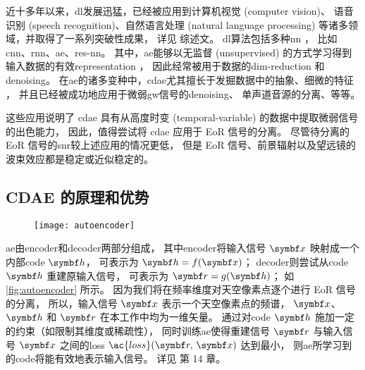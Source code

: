 近十多年以来，\ac{dl}发展迅猛，已经被应用到计算机视觉 (computer vision)、
语音识别 (speech recognition)、自然语言处理 (natural language processing)
等诸多领域，并取得了一系列突破性成果，
详见  综述文。
\ac{dl}算法包括多种\ac{nn} \cite{bengio2009,leCun2015,schmidhuber2015}，
比如\ac{cnn}、\ac{rnn}、\ac{ae}、\ac{res-nn}。
其中，\ac{ae}能够以无监督 (unsupervised) 的方式学习得到
输入数据的有效\ac{representation} \cite{bourlard1988}，
因此经常被用于数据的\ac{dim-reduction}\cite{hinton2006,wang2014}
和\ac{denoising}\cite{xie2012,lu2013,bengio2013}。
在\ac{ae}的诸多变种中，\ac{cdae}尤其擅长于发掘数据中的抽象、细微的特征 \cite{du2017}，
并且已经被成功地应用于微弱\ac{gw}信号的\ac{denoising}\cite{shen2017}、
单声道音源的分离\cite{grais2017}、等等。

这些应用说明了 \ac{cdae} 具有从高度时变 (temporal-variable)
的数据中提取微弱信号的出色能力，
因此，值得尝试将 \ac{cdae} 应用于 EoR 信号的分离。
尽管待分离的 EoR 信号的\ac{snr}较上述应用的情况更低，
但是 EoR 信号、前景辐射以及望远镜的波束效应都是稳定或近似稳定的。

\subsection{CDAE 的原理和优势}
\label{sec:cdae}

\begin{figure}[htp]
  \centering
  \texttt{[image: autoencoder]}
  \label{fig:autoencoder}
\end{figure}

\ac{ae}由\ac{encoder}和\ac{decoder}两部分组成，
其中\ac{encoder}将输入信号 $\B{x}$ 映射成一个内部\ac{code} $\B{h}$，
可表示为 $\B{h} = f(\B{x})$；
\ac{decoder}则尝试从\ac{code} $\B{h}$ 重建原输入信号，
可表示为 $\B{r} = g(\B{h})$；
如\autoref{fig:autoencoder} 所示。
因为我们将在频率维度对天空像素点逐个进行 EoR 信号的分离，
所以，输入信号 $\B{x}$ 表示一个天空像素点的频谱，
$\B{x}$、$\B{h}$ 和 $\B{r}$ 在本工作中均为一维矢量。
通过对\ac{code} $\B{h}$ 施加一定的约束（如限制其维度或稀疏性），
同时训练\ac{ae}使得重建信号 $\B{r}$ 与输入信号 $\B{x}$
之间的\acl{loss} $\ac{loss}(\B{r}, \,\B{x})$ 达到最小，
则\ac{ae}所学习到的\ac{code}将能有效地表示输入信号。
详见  第 14 章。

